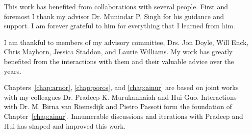 \begin{acknowledgements}

This work has benefited from collaborations with several people.
First and foremost I thank my advisor Dr. Munindar P. Singh for his guidance and support. 
I am forever grateful to him for everything that I learned from him. 

I am thankful to members of my advisory committee, Drs. Jon Doyle, Will Enck, Chris Mayhorn, Jessica Staddon, and Laurie Williams. 
My work has greatly benefited from the interactions with them and their valuable advice over the years. 

Chapters~\ref{chap:arnor}, \ref{chap:poros}, and \ref{chap:ainur} are based on joint
works with my colleagues Dr. Pradeep K. Murukannaiah and Hui Guo. 
Interactions with Dr. M. Birna van Riemsdijk and Pietro Passoti form the foundation of Chapter~\ref{chap:ainur}.
Innumerable discussions and iterations with Pradeep and Hui has shaped and improved this work. 


\end{acknowledgements}
